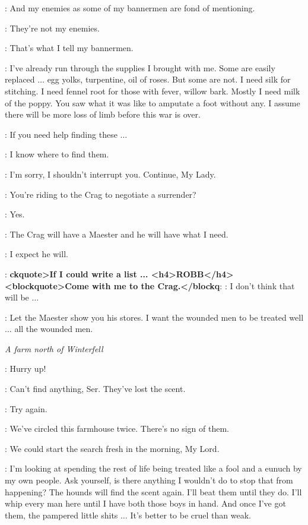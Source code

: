 \ROBB: And my enemies as some of my bannermen are fond of mentioning.

\TALISA: They're not my enemies.

\ROBB: That's what I tell my bannermen.

\TALISA: I've already run through the supplies I brought with me. Some are easily replaced $\ldots$ egg yolks, turpentine, oil of roses. But some are not. I need silk for stitching. I need fennel root for those with fever, willow bark. Mostly I need milk of the poppy. You saw what it was like to amputate a foot without any. I assume there will be more loss of limb before this war is over.

\ROBB: If you need help finding these $\ldots$

\TALISA: I know where to find them.

\ROBB: I'm sorry, I shouldn't interrupt you. Continue, My Lady.

\TALISA: You're riding to the Crag to negotiate a surrender?

\ROBB: Yes.

\TALISA: The Crag will have a Maester and he will have what I need.

\ROBB: I expect he will.

\TALISA: \textbf{ckquote>If I could write a list ... <h4>ROBB</h4> <blockquote>Come with me to the Crag.</blockq}: \TALISA: I don't think that will be $\ldots$

\ROBB: Let the Maester show you his stores. I want the wounded men to be treated well $\ldots$ all the wounded men.


\scene

\textit{A farm north of Winterfell}


\THEON: Hurry up!

\DAGMER: Can't find anything, Ser. They've lost the scent.

\THEON: Try again.

\DAGMER: We've circled this farmhouse twice. There's no sign of them.


\LUWIN: We could start the search fresh in the morning, My Lord.

\THEON: I'm looking at spending the rest of life being treated like a fool and a eunuch by my own people. Ask yourself, is there anything I wouldn't do to stop that from happening? The hounds will find the scent again. I'll beat them until they do. I'll whip every man here until I have both those boys in hand. And once I've got them, the pampered little shits $\ldots$ It's better to be cruel than weak.

